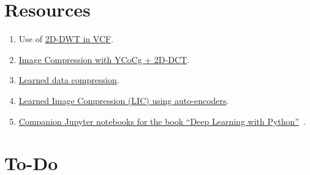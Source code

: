 \section{Resources}

\begin{enumerate}
\item Use of \href{https://github.com/Sistemas-Multimedia/VCF/blob/main/src/DWT.py}{2D-DWT in VCF}.
\item
  \href{https://github.com/vicente-gonzalez-ruiz/DCT2D/blob/master/src/DCT2D/YCoCg_2D_DCT_SQ.ipynb}{Image
    Compression with YCoCg + 2D-DCT}.
\item
  \href{https://www.tensorflow.org/tutorials/generative/data_compression}{Learned
    data compression}.
\item
  \href{https://github.com/vicente-gonzalez-ruiz/learned_image_compression/blob/main/LIC.ipynb}{Learned
    Image Compression (LIC) using auto-encoders}.
\item
  \href{https://github.com/fchollet/deep-learning-with-python-notebooks}{Companion
    Jupyter notebooks for the book ``Deep Learning with
    Python''}~\cite{chollet2021deep}.
\end{enumerate}


\section*{To-Do}

